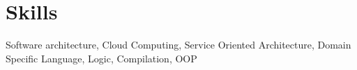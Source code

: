 \section{Skills}
Software architecture, Cloud Computing, Service Oriented Architecture, Domain Specific Language, Logic, Compilation, OOP
